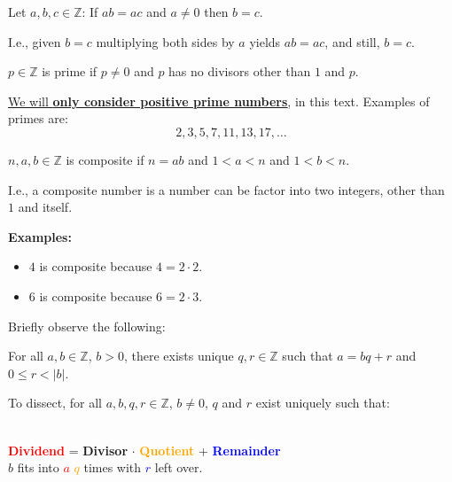 \begin{Def}

    \label{def:cancellation_law}

    Let $a,b,c\in\mathbb{Z}$: If $ab=ac$ and $a\neq 0$ then $b=c$.

\end{Def}

\noindent
I.e., given $b=c$ multiplying both sides by $a$ yields $ab=ac$, and still, $b=c$.

\newpage

\begin{Def}

    \label{def:prime_numbers}

    $p\in\mathbb{Z}$ is prime if $p\neq 0$ and $p$ has no divisors other than $1$ and $p$.
\end{Def}
\underline{We will \textbf{only consider positive prime numbers},} in this text. Examples of primes are:
$$2,3,5,7,11,13,17,\dots$$

\begin{Def}

    \label{def:composite_numbers}

    $n,a,b\in\mathbb{Z}$ is composite if $n=ab$ and $1<a<n$ and $1<b<n$.
\end{Def}
I.e., a composite number is a number can be factor into two integers, other than $1$ and itself.

\noindent
\textbf{Examples:}
\begin{itemize}
    \item $4$ is composite because $4=2\cdot2$.
    \item $6$ is composite because $6=2\cdot3$.
\end{itemize}

\noindent
Briefly observe the following:
\begin{theo}

    \label{theo:division_algorithm}

    For all $a,b\in\mathbb{Z}$, $b>0$, there exists unique $q,r\in\mathbb{Z}$ such that $a=bq+r$ and $0\leq r<|b|$.
\end{theo}

\noindent
To dissect, for all $a,b,q,r\in\mathbb{Z}$, $b\neq0$, $q$ and $r$ exist uniquely such that:

\begin{center}
    \HUGE{\textcolor{red}{$a$}=\textcolor{OliveGreen}{$b$}\textcolor{orange}{$q$}+\textcolor{blue}{$r$}}\\
    \vspace*{.5em}
    \LARGE{\textcolor{red}{\textbf{Dividend}} = \textcolor{OliveGreen}{\textbf{Divisor}} $\cdot$ \textcolor{orange}{\textbf{Quotient}} + \textcolor{blue}{\textbf{Remainder}}}\\
    \Large{\textcolor{OliveGreen}{$b$} fits into \textcolor{red}{$a$} \textcolor{orange}{$q$} times with \textcolor{blue}{$r$} left over.}
\end{center}

